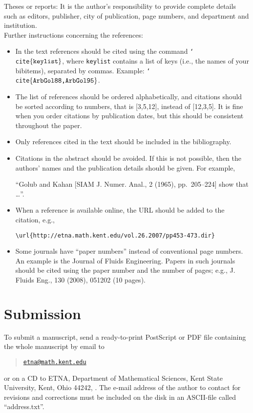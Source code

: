 \documentclass{scrartcl}
\begin{document}
\noindent Theses or reports: It is the author's responsibility to provide
complete details such as editors, publisher, city of publication, page numbers,
and department and institution.\\

\noindent Further instructions concerning the references:

\begin{itemize}
\item In the text references should be cited using the command
  \texttt{\char`\\cite$\{\mbox{\texttt{keylist}}\}$},
where \texttt{keylist} contains a list of keys (i.e., the names of your bibitems),
separated by commas. Example:
\texttt{\char`\\cite$\{\mbox{\texttt{ArbGol88,ArbGol95}}\}$}.
%
\item The list of references should be ordered alphabetically, and
citations should be sorted according to numbers, that is [3,5,12],
instead of [12,3,5]. It is fine when you order citations by publication
dates, but this should be consistent throughout the paper.
%
\item Only references cited in the text should be included in the bibliography.
%
\item Citations in the abstract should be avoided. If this is not possible,
then the authors' names and the publication details should be given. For example,

``Golub and Kahan [SIAM J. Numer. Anal., 2 (1965), pp.~205--224] show that
\dots''.

\item When a reference is available online, the URL should be added to the
  citation, e.g.,
%
\begin{verbatim}
\url{http://etna.math.kent.edu/vol.26.2007/pp453-473.dir}
\end{verbatim}

\item Some journals have ``paper numbers'' instead of conventional page
  numbers.  An example is the Journal of Fluids Engineering. Papers in such
  journals should be cited using the paper number and the number of pages;
  e.g., J. Fluids Eng., 130 (2008), 051202 (10 pages).


\end{itemize}


\section{Submission}
To submit a manuscript, send a ready-to-print PostScript or PDF file containing
the whole manuscript by email to
\begin{quote}
    \href{mailto:etna@math.kent.edu}{\nolinkurl{etna@math.kent.edu}}
\end{quote}
or on a CD to ETNA, Department of Mathematical Sciences, Kent State University,
Kent, Ohio 44242, \@USA. The e-mail address of the author to contact for
revisions and corrections must be included on the disk in an ASCII-file called
``address.txt''.
\end{document}

